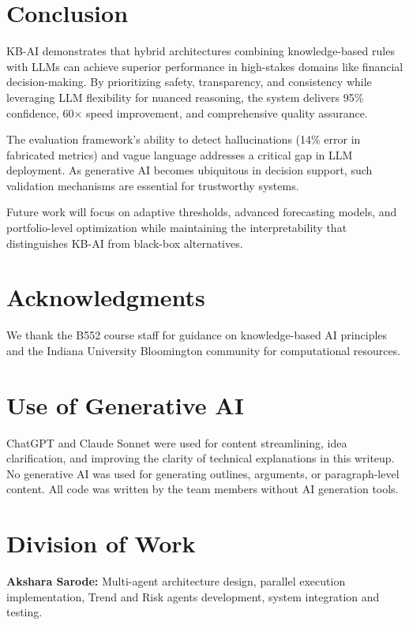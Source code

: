 \documentclass[11pt,letterpaper]{article}
\begin{document}
\section{Conclusion}

KB-AI demonstrates that hybrid architectures combining knowledge-based rules with LLMs can achieve superior performance in high-stakes domains like financial decision-making. By prioritizing safety, transparency, and consistency while leveraging LLM flexibility for nuanced reasoning, the system delivers 95\% confidence, 60× speed improvement, and comprehensive quality assurance.

The evaluation framework's ability to detect hallucinations (14\% error in fabricated metrics) and vague language addresses a critical gap in LLM deployment. As generative AI becomes ubiquitous in decision support, such validation mechanisms are essential for trustworthy systems.

Future work will focus on adaptive thresholds, advanced forecasting models, and portfolio-level optimization while maintaining the interpretability that distinguishes KB-AI from black-box alternatives.

\section*{Acknowledgments}

We thank the B552 course staff for guidance on knowledge-based AI principles and the Indiana University Bloomington community for computational resources.

\section*{Use of Generative AI}

ChatGPT and Claude Sonnet were used for content streamlining, idea clarification, and improving the clarity of technical explanations in this writeup. No generative AI was used for generating outlines, arguments, or paragraph-level content. All code was written by the team members without AI generation tools.

\section*{Division of Work}

\textbf{Akshara Sarode:} Multi-agent architecture design, parallel execution implementation, Trend and Risk agents development, system integration and testing.
\end{document}
